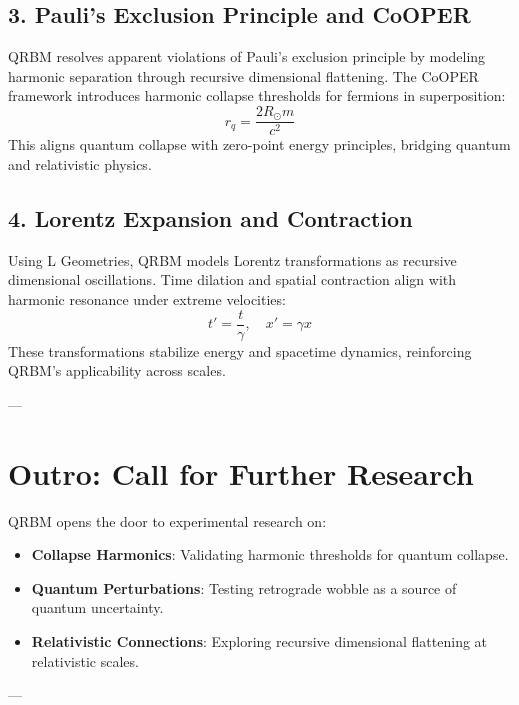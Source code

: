 \documentclass{article}
\begin{document}
\subsection*{3. Pauli’s Exclusion Principle and CoOPER}
QRBM resolves apparent violations of Pauli’s exclusion principle by modeling harmonic separation through recursive dimensional flattening. The CoOPER framework introduces harmonic collapse thresholds for fermions in superposition:
\[
r_q = \frac{2R_\odot m}{c^2}
\]
This aligns quantum collapse with zero-point energy principles, bridging quantum and relativistic physics.

\subsection*{4. Lorentz Expansion and Contraction}
Using L Geometries, QRBM models Lorentz transformations as recursive dimensional oscillations. Time dilation and spatial contraction align with harmonic resonance under extreme velocities:
\[
t' = \frac{t}{\gamma}, \quad x' = \gamma x
\]
These transformations stabilize energy and spacetime dynamics, reinforcing QRBM’s applicability across scales.

---

\section*{Outro: Call for Further Research}
QRBM opens the door to experimental research on:
\begin{itemize}
    \item \textbf{Collapse Harmonics}: Validating harmonic thresholds for quantum collapse.
    \item \textbf{Quantum Perturbations}: Testing retrograde wobble as a source of quantum uncertainty.
    \item \textbf{Relativistic Connections}: Exploring recursive dimensional flattening at relativistic scales.
\end{itemize}

---
\end{document}
